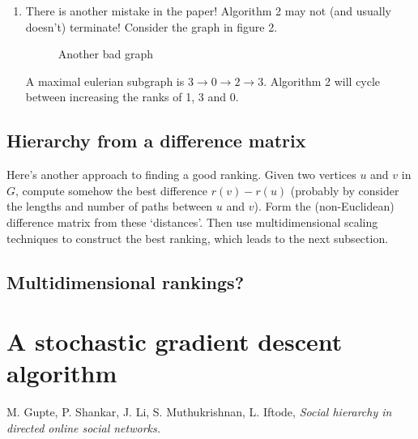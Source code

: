 \documentclass[11pt]{amsart}
\begin{document}
\begin{enumerate}
\item There is another mistake in the paper! Algorithm 2 may not (and usually doesn't) terminate! Consider the graph in figure 2. 
\begin{figure}[h]
\centering
{}
\caption{Another bad graph}
\label{gen}
\end{figure}
A maximal eulerian subgraph is $3 \to 0 \to 2 \to 3$. Algorithm 2 will cycle between increasing the ranks of 1, 3 and 0. 

\end{enumerate}


\subsection{Hierarchy from a difference matrix}

Here's another approach to finding a good ranking. Given two vertices $u$ and $v$ in $G$, compute somehow the best difference $r(v) - r(u)$ (probably by consider the lengths and number of paths between $u$ and $v$). Form the (non-Euclidean) difference matrix from these `distances'. Then use multidimensional scaling techniques to construct the best ranking, which leads to the next subsection. 

\subsection{Multidimensional rankings?}


\section{A stochastic gradient descent algorithm}


\begin{thebibliography}{4}


 M. Gupte, P. Shankar, J. Li, S. Muthukrishnan, L. Iftode, {\it Social hierarchy in directed online social networks.}


\end{thebibliography}


 
\end{document}
